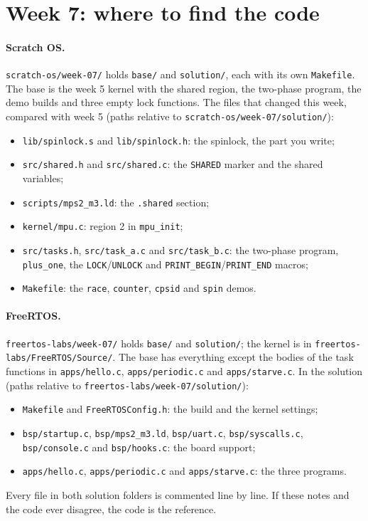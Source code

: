 \section{Week 7: where to find the code}
\paragraph{Scratch OS.} \texttt{scratch-os/week-07/} holds \texttt{base/} and \texttt{solution/}, each with its own \texttt{Makefile}. The base is the week 5 kernel with the shared region, the two-phase program, the demo builds and three empty lock functions. The files that changed this week, compared with week 5 (paths relative to \texttt{scratch-os/week-07/solution/}):
\begin{itemize}
    \item \texttt{lib/spinlock.s} and \texttt{lib/spinlock.h}: the spinlock, the part you write;
    \item \texttt{src/shared.h} and \texttt{src/shared.c}: the \texttt{SHARED} marker and the shared variables;
    \item \texttt{scripts/mps2\_m3.ld}: the \texttt{.shared} section;
    \item \texttt{kernel/mpu.c}: region 2 in \texttt{mpu\_init};
    \item \texttt{src/tasks.h}, \texttt{src/task\_a.c} and \texttt{src/task\_b.c}: the two-phase program, \texttt{plus\_one}, the \texttt{LOCK}/\texttt{UNLOCK} and \texttt{PRINT\_BEGIN}/\texttt{PRINT\_END} macros;
    \item \texttt{Makefile}: the \texttt{race}, \texttt{counter}, \texttt{cpsid} and \texttt{spin} demos.
\end{itemize}

\paragraph{FreeRTOS.} \texttt{freertos-labs/week-07/} holds \texttt{base/} and \texttt{solution/}; the kernel is in \texttt{freertos-labs/FreeRTOS/Source/}. The base has everything except the bodies of the task functions in \texttt{apps/hello.c}, \texttt{apps/periodic.c} and \texttt{apps/starve.c}. In the solution (paths relative to \texttt{freertos-labs/week-07/solution/}):
\begin{itemize}
    \item \texttt{Makefile} and \texttt{FreeRTOSConfig.h}: the build and the kernel settings;
    \item \texttt{bsp/startup.c}, \texttt{bsp/mps2\_m3.ld}, \texttt{bsp/uart.c}, \texttt{bsp/syscalls.c}, \texttt{bsp/console.c} and \texttt{bsp/hooks.c}: the board support;
    \item \texttt{apps/hello.c}, \texttt{apps/periodic.c} and \texttt{apps/starve.c}: the three programs.
\end{itemize}
Every file in both solution folders is commented line by line. If these notes and the code ever disagree, the code is the reference.

